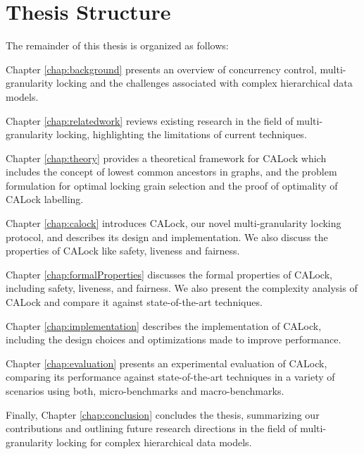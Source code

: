 


\section{Thesis Structure}
The remainder of this thesis is organized as follows:

 Chapter \ref{chap:background} presents an overview of concurrency control, multi-granularity locking and the challenges associated with complex hierarchical data models. 

 Chapter \ref{chap:relatedwork} reviews existing research in the field of multi-granularity locking, highlighting the limitations of current techniques. 

 Chapter \ref{chap:theory} provides a theoretical framework for CALock which includes the concept of lowest common ancestors in graphs, and the problem formulation for optimal locking grain selection and the proof of optimality of CALock labelling.

 Chapter \ref{chap:calock} introduces CALock, our novel multi-granularity locking protocol, and describes its design and implementation. We also discuss the properties of CALock like safety, liveness and fairness.

Chapter \ref{chap:formalProperties} discusses the formal properties of CALock, including safety, liveness, and fairness. We also present the complexity analysis of CALock and compare it against state-of-the-art techniques.

 Chapter \ref{chap:implementation} describes the implementation of CALock, including the design choices and optimizations made to improve performance.
 
 Chapter \ref{chap:evaluation} presents an experimental evaluation of CALock, comparing its performance against state-of-the-art techniques in a variety of scenarios using both, micro-benchmarks and macro-benchmarks.
 
 Finally, Chapter \ref{chap:conclusion} concludes the thesis, summarizing our contributions and outlining future research directions in the field of multi-granularity locking for complex hierarchical data models.

